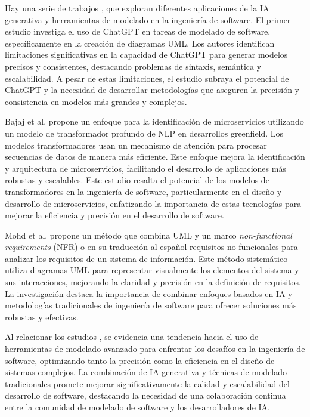 Hay una serie de trabajos \cite{Cámara2023}\cite{Bajaj2024}\cite{Arif2023}, que exploran diferentes aplicaciones de la IA generativa y herramientas de modelado en la ingeniería de software. El primer estudio \cite{Cámara2023} investiga el uso de ChatGPT en tareas de modelado de software, específicamente en la creación de diagramas UML. Los autores identifican limitaciones significativas en la capacidad de ChatGPT para generar modelos precisos y consistentes, destacando problemas de sintaxis, semántica y escalabilidad. A pesar de estas limitaciones, el estudio subraya el potencial de ChatGPT y la necesidad de desarrollar metodologías que aseguren la precisión y consistencia en modelos más grandes y complejos. 

Bajaj et al. \cite{Bajaj2024} propone un enfoque para la identificación de microservicios utilizando un modelo de transformador profundo de NLP en desarrollos greenfield. Los modelos transformadores usan un mecanismo de atención para procesar secuencias de datos de manera más eficiente. Este enfoque mejora la identificación y arquitectura de microservicios, facilitando el desarrollo de aplicaciones más robustas y escalables. Este estudio resalta el potencial de los modelos de transformadores en la ingeniería de software, particularmente en el diseño y desarrollo de microservicios, enfatizando la importancia de estas tecnologías para mejorar la eficiencia y precisión en el desarrollo de software.

Mohd et al. \cite{Arif2023} propone un método que combina UML y un marco \textit{non-functional requirements} (NFR) o en su traducción al español requisitos no funcionales para analizar los requisitos de un sistema de información. Este método sistemático utiliza diagramas UML para representar visualmente los elementos del sistema y sus interacciones, mejorando la claridad y precisión en la definición de requisitos. La investigación destaca la importancia de combinar enfoques basados en IA y metodologías tradicionales de ingeniería de software para ofrecer soluciones más robustas y efectivas. 

Al relacionar los estudios \cite{Cámara2023}\cite{Bajaj2024}\cite{Arif2023} , se evidencia una tendencia hacia el uso de herramientas de modelado avanzado para enfrentar los desafíos en la ingeniería de software, optimizando tanto la precisión como la eficiencia en el diseño de sistemas complejos. La combinación de IA generativa y técnicas de modelado tradicionales promete mejorar significativamente la calidad y escalabilidad del desarrollo de software, destacando la necesidad de una colaboración continua entre la comunidad de modelado de software y los desarrolladores de IA.

